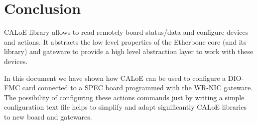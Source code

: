 \section{Conclusion}

CALoE library allows to read remotely board status/data and configure devices and actions. It abstracts the low level properties of the Etherbone core (and its library) and gateware to provide a high level abstraction layer to work with these devices. 

In this document we have shown how CALoE can be used to configure a DIO-FMC card connected to a SPEC board programmed with the WR-NIC gateware.
The possibility of configuring these actions commands just by writing a simple configuration text file helps to simplify and adapt significantly CALoE libraries to new board and gatewares. 
